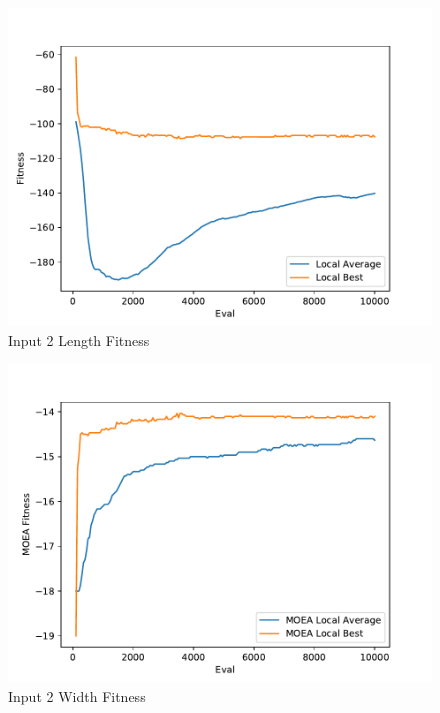 \documentclass{standalone}
\begin{document}
\begin{figure}[!htb]
	\caption{Input 2 Length Fitness}
	\label{fig:graph_2006}
	\includegraphics[width=\textwidth]{../graphs/graphs/2006.pdf}
\end{figure}


\begin{figure}[!htb]
	\caption{Input 2 Width Fitness}
	\label{fig:graph_2006_moea}
	\includegraphics[width=\textwidth]{../graphs/graphs/2006_moea.pdf}
\end{figure}
\end{document}
